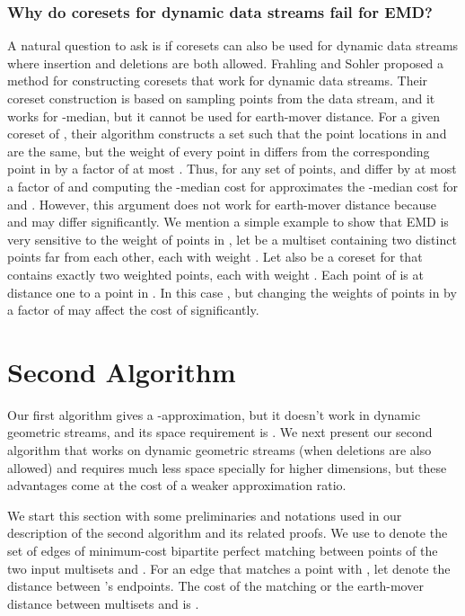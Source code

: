 \documentclass[oribibl]{llncs}
\begin{document}
\subsubsection{Why do coresets for dynamic data streams fail for EMD?}
A natural question to ask is if coresets can also be used for dynamic data
streams where insertion and deletions are both allowed.
Frahling and Sohler \cite{coreset_dynamic}
proposed a method for constructing coresets that work for dynamic data streams.
Their coreset construction is based on sampling points from the
data stream, and it works for -median, but it cannot be
used for earth-mover distance.
For a given coreset  of , their algorithm constructs
a set  such that the point locations in  and
 are the same, but the weight of every point in 
differs from the corresponding point in  by a factor of
at most .
Thus, for any set  of  points,  and
 differ by at most a factor of 
and computing the -median cost for  approximates
the -median cost for  and .
However, this argument does not work for earth-mover distance because
 and  may differ 
significantly.
We mention a simple example to show that EMD is very sensitive to
the weight of points in , 
let  be a multiset containing two distinct points far from each other,
each with weight .
Let also  be a coreset for  that contains
exactly two weighted points, each with weight .
Each point of  is at distance one to a point in .
In this case , but changing the weights of points in
 by a factor of  may affect the cost of
 significantly.

\section{Second Algorithm}\label{algorithm2}
Our first algorithm gives a -approximation, but it doesn't work
in dynamic geometric streams, and its space requirement is
.
We next present our second algorithm that works on dynamic geometric streams
(when deletions are also allowed) and requires much less space specially for
higher dimensions, but these advantages come at the cost of a weaker
approximation ratio.
 
We start this section with some preliminaries and notations
used in our description of the second algorithm and its related proofs.
We use  to denote the set of edges of minimum-cost bipartite perfect
matching between points of the two input multisets  and . 
For an edge  that matches a point 
with , let  denote the  distance between 's
endpoints.
The cost of the matching  or the earth-mover
distance between multisets  and  is .
\end{document}
